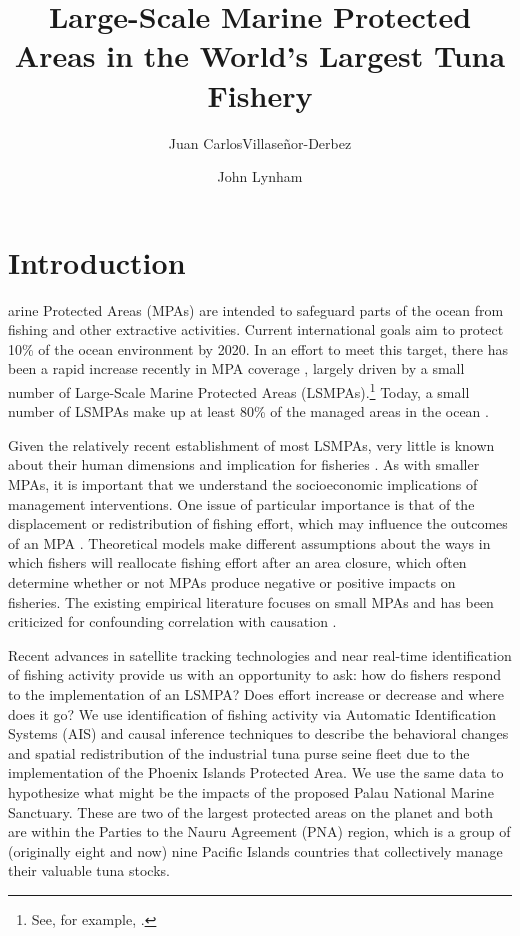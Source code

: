 \documentclass[9p,twocolumn,twoside,lineno]{pnas-new}
\title{Large-Scale Marine Protected Areas in the World's Largest Tuna Fishery}
\author[a,1]{Juan CarlosVillase\~{n}or-Derbez}
\author[b,1]{John Lynham}
\affil[a]{Bren School of Environmental Science \& Management, University of California at Santa Barbara, Santa Barbara, CA}
\affil[b]{Department of Economics, University of Hawaii at Manoa, Honolulu, HI}
\begin{document}
\maketitle
\thispagestyle{firststyle}






\section{Introduction}\label{introduction}

arine Protected Areas (MPAs) are intended to safeguard parts of the
ocean from fishing and other extractive activities. Current
international goals aim to protect 10\% of the ocean environment by
2020. In an effort to meet this target, there has been a rapid
increase recently in MPA coverage \citep{wood_2008,sala_2018}, largely driven by
a small number of Large-Scale Marine Protected Areas (LSMPAs).\footnote{See, for example, \citep{game_2009,singleton_2014,boonzaier_2016,mccauley_2016,alger_2017}.}
Today, a small number of LSMPAs make up at least 80\%
of the managed areas in the ocean \citep{toonen_2013}.

Given the relatively recent establishment of most LSMPAs, very little is
known about their human dimensions and implication for fisheries
\citep{gray_2017}. As with smaller MPAs, it is important that we
understand the socioeconomic implications of management interventions.
One issue of particular importance is that of the displacement or
redistribution of fishing effort, which may influence the outcomes of an
MPA \citep{smith_2003}. Theoretical models make different assumptions
about the ways in which fishers will reallocate fishing effort after an
area closure, which often determine whether or not MPAs produce negative or positive impacts on fisheries. The existing empirical literature focuses on small MPAs and has been criticized for confounding correlation with causation \citep{ferraro2018causal}.

Recent advances in satellite tracking technologies and near real-time
identification of fishing activity provide us with an opportunity to ask: how do fishers respond to the implementation of an LSMPA? Does effort increase or decrease and where does it go? We use identification of fishing activity via Automatic
Identification Systems (AIS) and causal inference techniques to describe
the behavioral changes and spatial redistribution of the industrial tuna
purse seine fleet due to the implementation of the Phoenix Islands Protected Area. We use the same data to hypothesize what might be the impacts of the proposed Palau National Marine Sanctuary. These are two of the largest protected areas on the planet and both are within the Parties to the Nauru Agreement (PNA) region, which is a group of (originally eight and now) nine Pacific Islands countries that collectively manage their valuable tuna stocks.
\end{document}
